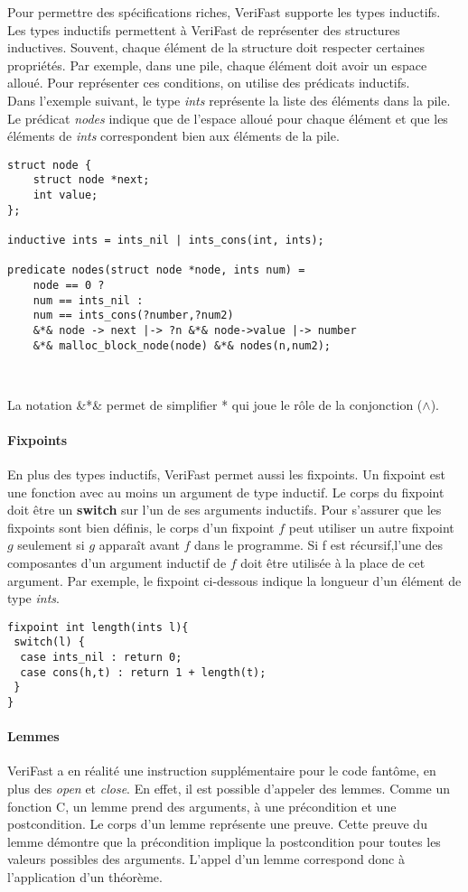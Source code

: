 \documentclass[11pt,openany]{article}
\newcommand{\verifast}{VeriFast}
\begin{document}
				Pour permettre des sp\'ecifications riches, \verifast{} supporte les types inductifs. Les types inductifs permettent \`a \verifast{} de repr\'esenter des structures inductives. Souvent, chaque \'el\'ement de la structure doit respecter certaines propri\'et\'es. Par exemple, dans une pile, chaque \'el\'ement doit avoir un espace allou\'e.	Pour repr\'esenter ces conditions, on utilise des pr\'edicats inductifs.\\ Dans l'exemple suivant, le type \textit{ints} repr\'esente la liste des \'el\'ements dans la pile. Le pr\'edicat \textit{nodes} indique que de l'espace allou\'e pour chaque \'el\'ement et que les \'el\'ements de \textit{ints} correspondent bien aux \'el\'ements de la pile.
				
			
			\begin{lstlisting}
struct node {
	struct node *next;
	int value;
};
				
inductive ints = ints_nil | ints_cons(int, ints);

predicate nodes(struct node *node, ints num) =
	node == 0 ?
	num == ints_nil :
	num == ints_cons(?number,?num2) 
	&*& node -> next |-> ?n &*& node->value |-> number
	&*& malloc_block_node(node) &*& nodes(n,num2);

	
			\end{lstlisting}
			
			La notation \&*\& permet de simplifier * qui joue le r\^ole de la conjonction ($\land$).			
			\paragraph{Fixpoints}
				En plus des types inductifs, \verifast{} permet aussi les fixpoints. Un fixpoint est une fonction avec au moins un argument de type inductif. Le corps du fixpoint doit \^etre un \textbf{switch} sur l'un de ses arguments inductifs. Pour s'assurer que les fixpoints sont bien d\'efinis, le corps d'un fixpoint $f$ peut utiliser un autre fixpoint $g$ seulement si $g$ appara\^it avant $f$ dans le programme. Si f est r\'ecursif,l'une des composantes d'un argument inductif de $f$ doit \^etre utilis\'ee \`a la place de cet argument. Par exemple, le fixpoint ci-dessous indique la longueur d'un \'el\'ement de type \textit{ints}.
			\begin{lstlisting}
fixpoint int length(ints l){
 switch(l) {
  case ints_nil : return 0;
  case cons(h,t) : return 1 + length(t);
 }
}
			\end{lstlisting}
			\paragraph{Lemmes}
			\verifast{} a en r\'ealit\'e une instruction suppl\'ementaire pour le code fant\^ome, en plus des \textit{open} et \textit{close}. En effet, il est possible d'appeler des lemmes. Comme un fonction C, un lemme prend des arguments, \`a une pr\'econdition et une postcondition. Le corps d'un lemme repr\'esente une preuve. Cette preuve du lemme d\'emontre que la pr\'econdition implique la postcondition pour toutes les valeurs possibles des arguments. L'appel d'un lemme correspond donc \`a l'application d'un th\'eor\`eme.
			
\end{document}
